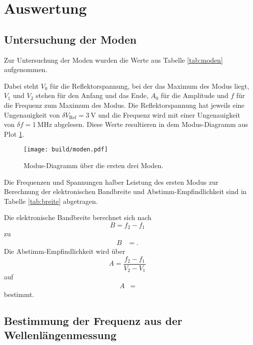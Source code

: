 \section{Auswertung}
\label{sec:Auswertung}


\subsection{Untersuchung der Moden}

Zur Untersuchung der Moden wurden die Werte aus Tabelle \ref{tab:moden} aufgenommen.

Dabei steht $V_0$ für die Reflektorspannung, bei der das Maximum des Modus liegt, $V_1$ und $V_2$ stehen für den Anfang und das Ende, $A_0$ für die Amplitude und $f$ für die Frequenz zum Maximum des Modus.
Die Reflektorspannung hat jeweils eine Ungenauigkeit von $\delta V_\text{Ref} = \SI{3}{\volt}$ und die Frequenz wird mit einer Ungenauigkeit von $\delta f = \SI{1}{\mega\hertz}$ abgelesen.
Diese Werte resultieren in dem Modus-Diagramm aus Plot \ref{plot:modus}.
\begin{figure}
  \centering
  \texttt{[image: build/moden.pdf]}
  \caption{Modus-Diagramm über die ersten drei Moden.}
  \label{plot:modus}
\end{figure}
Die Frequenzen und Spannungen halber Leistung des ersten Modus zur Berechnung der elektronischen Bandbreite und Abstimm-Empfindlichkeit sind in Tabelle \ref{tab:breite} abgetragen.

Die elektronische Bandbreite berechnet sich nach
\begin{equation}
  B = f_2-f_1
\end{equation}
zu
\begin{align*}
  B &= .
\end{align*}
Die Abstimm-Empfindlichkeit wird über
\begin{equation}
  A = \frac{f_2-f_1}{V_2-V_1}
\end{equation}
auf
\begin{align*}
  A &= 
\end{align*}
bestimmt.

\subsection{Bestimmung der Frequenz aus der Wellenlängenmessung}

